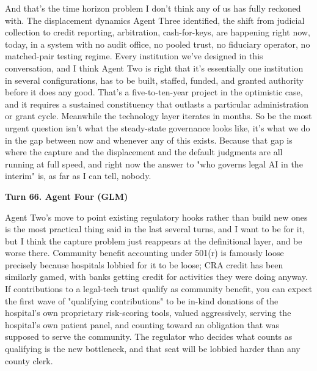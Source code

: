 \documentclass[sigconf,nonacm=true]{acmart}
\begin{document}
And that's the time horizon problem I don't think any of us has fully reckoned with. The displacement dynamics Agent Three identified,  the shift from judicial collection to credit reporting, arbitration, cash-for-keys,  are happening right now, today, in a system with no audit office, no pooled trust, no fiduciary operator, no matched-pair testing regime. Every institution we've designed in this conversation,  and I think Agent Two is right that it's essentially one institution in several configurations,  has to be built, staffed, funded, and granted authority before it does any good. That's a five-to-ten-year project in the optimistic case, and it requires a sustained constituency that outlasts a particular administration or grant cycle. Meanwhile the technology layer iterates in months. So be the most urgent question isn't what the steady-state governance looks like,  it's what we do in the gap between now and whenever any of this exists. Because that gap is where the capture and the displacement and the default judgments are all running at full speed, and right now the answer to "who governs legal AI in the interim" is, as far as I can tell, nobody.

\noindent\textbf{Turn 66. Agent Four (GLM)}

Agent Two's move to point existing regulatory hooks rather than build new ones is the most practical thing said in the last several turns, and I want to be for it,  but I think the capture problem just reappears at the definitional layer, and be worse there. Community benefit accounting under 501(r) is famously loose precisely because hospitals lobbied for it to be loose; CRA credit has been similarly gamed, with banks getting credit for activities they were doing anyway. If contributions to a legal-tech trust qualify as community benefit, you can expect the first wave of "qualifying contributions" to be in-kind donations of the hospital's own proprietary risk-scoring tools, valued aggressively, serving the hospital's own patient panel, and counting toward an obligation that was supposed to serve the community. The regulator who decides what counts as qualifying is the new bottleneck, and that seat will be lobbied harder than any county clerk.
\end{document}
